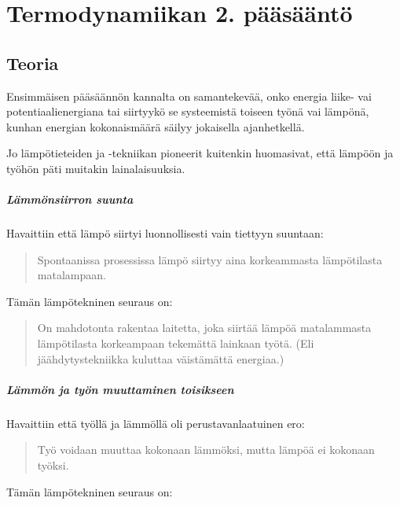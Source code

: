 \documentclass[12pt,a4paper,finnish]{book}
\begin{document}
\chapter{Termodynamiikan 2. pääsääntö} %

\section{Teoria} %

Ensimmäisen pääsäännön kannalta on samantekevää, onko energia liike- vai potentiaalienergiana tai 
siirtyykö se systeemistä toiseen työnä vai lämpönä, kunhan energian kokonaismäärä säilyy jokaisella 
ajanhetkellä.

Jo lämpötieteiden ja -tekniikan pioneerit kuitenkin huomasivat, että lämpöön ja työhön päti muitakin
lainalaisuuksia.

\paragraph{Lämmönsiirron suunta}

Havaittiin että lämpö siirtyi luonnollisesti vain tiettyyn suuntaan:

\begin{quote}
 Spontaanissa prosessissa lämpö siirtyy aina korkeammasta lämpötilasta matalampaan.
\end{quote}

Tämän lämpötekninen seuraus on:

\begin{quote}
 On mahdotonta rakentaa laitetta, joka siirtää lämpöä matalammasta lämpötilasta korkeampaan tekemättä 
 lainkaan työtä. (Eli jäähdytystekniikka kuluttaa väistämättä energiaa.)
\end{quote}

\paragraph{Lämmön ja työn muuttaminen toisikseen}

Havaittiin että työllä ja lämmöllä oli perustavanlaatuinen ero:

\begin{quote}
 Työ voidaan muuttaa kokonaan lämmöksi, mutta lämpöä ei kokonaan työksi.
\end{quote}

Tämän lämpötekninen seuraus on:
\end{document}
